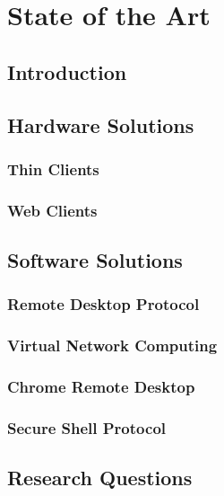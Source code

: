 \chapter{State of the Art} %

\label{Chapter3} %


\section{Introduction}

\todosection


\section{Hardware Solutions}

\todosection


\subsection{Thin Clients}

\todosection


\subsection{Web Clients}

\todosection


\section{Software Solutions}

\todosection


\subsection{Remote Desktop Protocol}

\todosection


\subsection{Virtual Network Computing}

\todosection


\subsection{Chrome Remote Desktop}

\todosection


\subsection{Secure Shell Protocol}

\todosection


\section{Research Questions}
\todosection